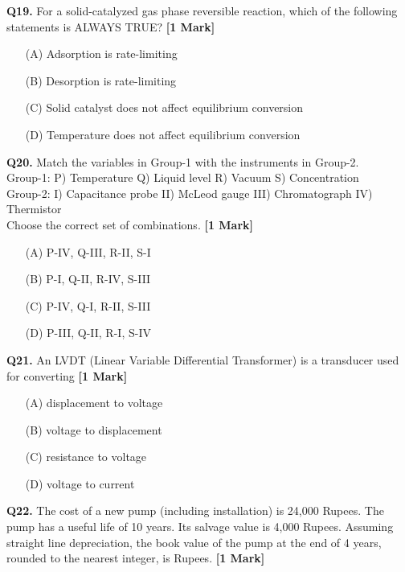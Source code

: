 \documentclass[11pt]{article}
\newcommand{\questiona}[2]{
    \noindent\textbf{Q#2.} #1 \hfill \textbf{[1 Mark]}
}
\begin{document}
\questiona{For a solid-catalyzed gas phase reversible reaction, which of the following statements is ALWAYS TRUE?}{19}
\begin{enumerate}
    \item[(A)] Adsorption is rate-limiting  
    \item[(B)] Desorption is rate-limiting  
    \item[(C)] Solid catalyst does not affect equilibrium conversion  
    \item[(D)] Temperature does not affect equilibrium conversion  
\end{enumerate}
\vspace{0.5cm}

\questiona{Match the variables in Group-1 with the instruments in Group-2.  
\\ Group-1: P) Temperature Q) Liquid level R) Vacuum S) Concentration  
\\ Group-2: I) Capacitance probe II) McLeod gauge III) Chromatograph IV) Thermistor  
\\ Choose the correct set of combinations.}{20}
\begin{enumerate}
    \item[(A)] P-IV, Q-III, R-II, S-I  
    \item[(B)] P-I, Q-II, R-IV, S-III  
    \item[(C)] P-IV, Q-I, R-II, S-III  
    \item[(D)] P-III, Q-II, R-I, S-IV  
\end{enumerate}
\vspace{0.5cm}

\questiona{An LVDT (Linear Variable Differential Transformer) is a transducer used for converting}{21}
\begin{enumerate}
    \item[(A)] displacement to voltage  
    \item[(B)] voltage to displacement  
    \item[(C)] resistance to voltage  
    \item[(D)] voltage to current  
\end{enumerate}
\vspace{0.5cm}

\questiona{The cost of a new pump (including installation) is 24,000 Rupees. The pump has a useful life of 10 years. Its salvage value is 4,000 Rupees. Assuming straight line depreciation, the book value of the pump at the end of 4 years, rounded to the nearest integer, is Rupees.}{22}
\vspace{0.5cm}
\end{document}
